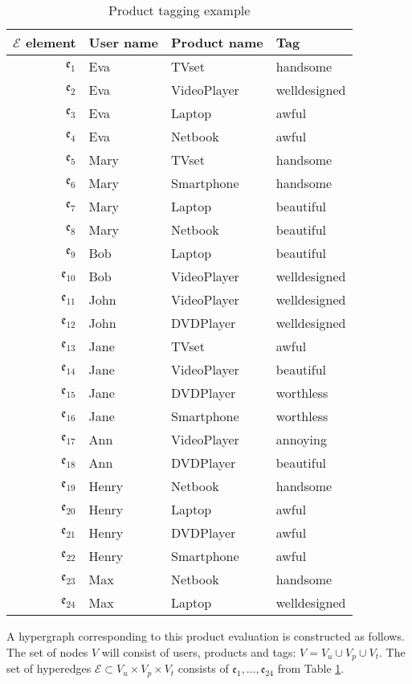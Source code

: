 \documentclass{fundam}
\newcommand{\HEM}{\mathcal{E}}
\newcommand{\hem}{\mathfrak{e}}
\newcommand{\N}{ V }
\begin{document}
\begin{example}
\begin{table}[ht!]
\vspace*{-4mm}
\caption{Product tagging example }\label{tab:tagging}
\begin{center}
\begin{tabular}{|r|lll|}
\hline
$\HEM$ element &User  name & Product name &  Tag\\
\hline
$\hem_1$&Eva & TVset & handsome\\
$\hem_2$&Eva & VideoPlayer & welldesigned\\
$\hem_3$&Eva & Laptop & awful\\
$\hem_4$&Eva & Netbook & awful\\
$\hem_5$&Mary & TVset & handsome\\
\hline
$\hem_6$&Mary & Smartphone & handsome\\
$\hem_7$&Mary & Laptop & beautiful\\
$\hem_8$&Mary & Netbook & beautiful\\
$\hem_9$&Bob & Laptop & beautiful\\
$\hem_{10}$&Bob & VideoPlayer & welldesigned\\
\hline
$\hem_{11}$&John & VideoPlayer & welldesigned\\
$\hem_{12}$&John & DVDPlayer & welldesigned\\
$\hem_{13}$&Jane & TVset & awful\\
$\hem_{14}$&Jane & VideoPlayer & beautiful\\
$\hem_{15}$&Jane & DVDPlayer & worthless\\
\hline
$\hem_{16}$&Jane & Smartphone & worthless\\
$\hem_{17}$&Ann & VideoPlayer & annoying\\
$\hem_{18}$&Ann & DVDPlayer & beautiful\\
$\hem_{19}$&Henry & Netbook & handsome\\
$\hem_{20}$&Henry & Laptop & awful\\
\hline
$\hem_{21}$&Henry & DVDPlayer & awful\\
$\hem_{22}$&Henry & Smartphone & awful\\
$\hem_{23}$&Max & Netbook & handsome\\
$\hem_{24}$&Max & Laptop & welldesigned\\
\hline
\end{tabular}

\end{center}
\end{table}

\medskip
A hypergraph corresponding to this product evaluation is constructed as follows. The set of nodes $\N$ will consist of users, products and tags: $\N=\N_u\cup\N_p\cup\N_t$. The set of hyperedges $\HEM\subset \N_u\times\N_p\times\N_t$ consists of $\hem_{1},\dots,\hem_{24}$ from Table \ref{tab:tagging}.
\end{example} %
\end{document}
